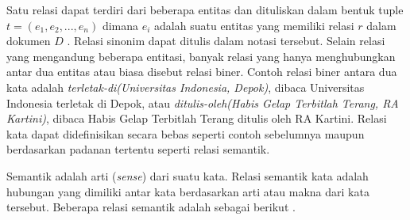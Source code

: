 Satu relasi dapat terdiri dari beberapa entitas dan dituliskan dalam bentuk tuple $t = (e_1, e_2, ..., e_n)$ dimana $e_i$ adalah suatu entitas yang memiliki relasi $r$ dalam dokumen $D$ \citep{bach2007review}. Relasi sinonim dapat ditulis dalam notasi tersebut. Selain relasi yang mengandung beberapa entitasi, banyak relasi yang hanya menghubungkan antar dua entitas atau biasa disebut relasi biner. Contoh relasi biner antara dua kata adalah \textit{terletak-di(Universitas Indonesia, Depok)}, dibaca Universitas Indonesia terletak di Depok, atau \textit{ditulis-oleh(Habis Gelap Terbitlah Terang, RA Kartini)}, dibaca Habis Gelap Terbitlah Terang ditulis oleh RA Kartini. Relasi kata dapat didefinisikan secara bebas seperti contoh sebelumnya maupun berdasarkan padanan tertentu seperti relasi semantik.

Semantik adalah arti (\textit{sense}) dari suatu kata. Relasi semantik kata adalah hubungan yang dimiliki antar kata berdasarkan arti atau makna dari kata tersebut. Beberapa relasi semantik adalah sebagai berikut \citep{miller1995wordnet}.
